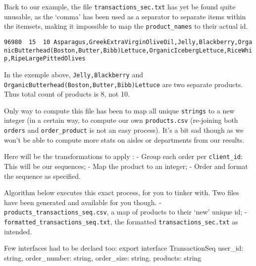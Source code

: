 \documentclass[11pt]{article}
\begin{document}
Back to our example, the file \texttt{transactions\_sec.txt} has yet be
found quite unusable, as the `comma' has been used as a separator to
separate items within the itemsets, making it impossible to map the
\texttt{product\_names} to their actual id.

\texttt{96980\ \ 15\ \ 10\ Asparagus,GreekExtraVirginOliveOil,Jelly,Blackberry,OrganicButterhead(Boston,Butter,Bibb)Lettuce,OrganicIcebergLettuce,RiceWhip,RipeLargePittedOlives}

In the exemple above, \texttt{Jelly,Blackberry} and
\texttt{OrganicButterhead(Boston,Butter,Bibb)Lettuce} are two separate
products. Thus total count of products is 8, not 10.

Only way to compute this file has been to map all unique
\texttt{strings} to a new integer (in a certain way, to compute our own
\texttt{products.csv} (re-joining both \texttt{orders} and
\texttt{order\_product} is not an easy process). It's a bit sad though
as we won't be able to compute more stats on aisles or departments from
our results.

Here will be the transformations to apply : - Group each order per
\texttt{client\_id}: This will be our sequences; - Map the product to an
integer; - Order and format the sequence as specified.

Algorithm below executes this exact process, for you to tinker with. Two
files have been generated and available for you though. -
\texttt{products\_transactions\_seq.csv}, a map of products to their
`new' unique id; - \texttt{formatted\_transactions\_seq.txt}, the
formatted \texttt{transactions\_sec.txt} as intended.

Few interfaces had to be declaed too:
export interface TransactionSeq {
    user_id: string,
    order_number: string,
    order_size: string,
    products: string
}
\end{document}
